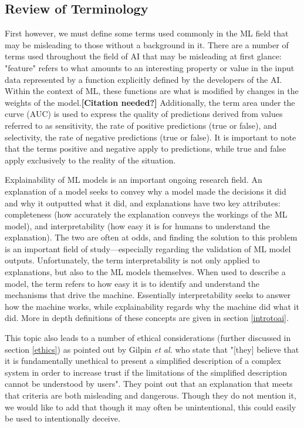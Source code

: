 \documentclass[]{article}
\begin{document}
		\subsection{Review of Terminology}
			First however, we must define some terms used commonly in the ML field that may be misleading to those without a background in it. There are a number of terms used throughout the field of AI that may be misleading at first glance: "feature" refers to what amounts to an interesting property or value in the input data represented by a function explicitly defined by the developers of the AI. Within the context of ML, these functions are what is modified by changes in the weights of the model.\textbf{[Citation needed?]} Additionally, the term area under the curve (AUC) is used to express the quality of predictions derived from values referred to as sensitivity, the rate of positive predictions (true or false), and selectivity, the rate of negative predictions (true or false). It is important to note that the terms positive and negative apply to predictions, while true and false apply exclusively to the reality of the situation.\cite{introtoauc}

			Explainability of ML models is an important ongoing research field. An explanation of a model seeks to convey why a model made the decisions it did and why it outputted what it did, and explanations have two key attributes: completeness (how accurately the explanation conveys the workings of the ML model), and interpretability (how easy it is for humans to understand the explanation). The two are often at odds, and finding the solution to this problem is an important field of study\cite{8631448}---especially regarding the validation of ML model outputs.\cite{10.1145/3328519.3329126} Unfortunately, the term interpretability is not only applied to explanations, but also to the ML models themselves. When used to describe a model, the term refers to how easy it is to identify and understand the mechanisms that drive the machine. Essentially interpretability seeks to answer how the machine works, while explainability regards why the machine did what it did.\cite{8631448} More in depth definitions of these concepts are given in section \ref{introtoai}.

			This topic also leads to a number of ethical considerations (further discussed in section \ref{ethics}) as pointed out by Gilpin \emph{et al.} who state that "[they] believe that it is fundamentally unethical to present a simplified description of a complex system in order to increase trust if the limitations of the simplified description cannot be understood by users". They point out that an explanation that meets that criteria are both misleading and dangerous.\cite{8631448} Though they do not mention it, we would like to add that though it may often be unintentional, this could easily be used to intentionally deceive. 
			
\end{document}
